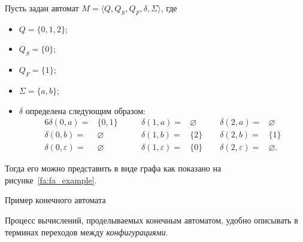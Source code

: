 \begin{example}
    Пусть задан автомат $M=\langle Q, Q_S, Q_F, \delta, \Sigma\rangle$, где
    \begin{itemize}
        \item $Q = \{0,1,2\}$;
        \item $Q_S = \{0\}$;
        \item $Q_F = \{1\}$;
        \item $\Sigma = \{a,b\}$;
        \item $\delta$ определена следующим образом: 
        \begin{alignat*}{6}
            \delta(0,a) =& \{0,1\}      \qquad    & \delta(1,a) =& \varnothing \qquad & \delta(2,a) =& \varnothing \\
            \delta(0,b) =& \varnothing           & \delta(1,b) =& \{2\}             & \delta(2,b) =& \{1\} \\
            \delta(0,\varepsilon) =& \varnothing & \delta(1,\varepsilon) =& \{0\}   & \delta(2,\varepsilon) =& \varnothing.
        \end{alignat*}
    \end{itemize}
    Тогда его можно представить в виде графа как показано на рисунке~\ref{fa:fa_example}.
    \begin{marginfigure}    
        \begin{center}
        \end{center}
        \caption{Пример конечного автомата}
        \label{fa:fa_example}
    \end{marginfigure}
\end{example}

Процесс вычислений, проделываемых конечным автоматом, удобно описывать в терминах переходов между \emph{конфигурациями}.

